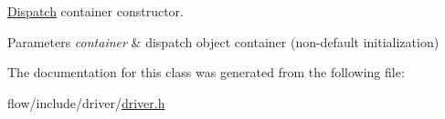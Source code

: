 \hyperlink{classflow_1_1_dispatch}{Dispatch} container constructor. 


\begin{DoxyParams}{Parameters}
{\em container} & dispatch object container (non-\/default initialization) \\
\hline
\end{DoxyParams}


The documentation for this class was generated from the following file\+:\begin{DoxyCompactItemize}
\item 
flow/include/driver/\hyperlink{driver_8h}{driver.\+h}\end{DoxyCompactItemize}
